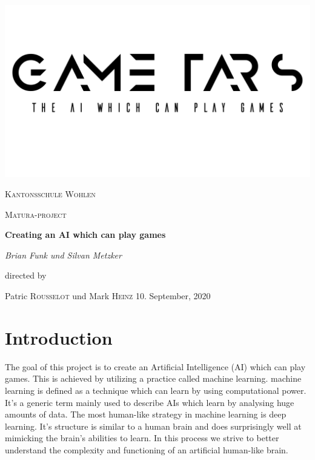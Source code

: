 \documentclass[12pt]{article}
\begin{document}

\begin{titlepage}
    \centering
    \includegraphics[width=1\textwidth]{pictures/title.pdf}\par\vspace{0.5cm}
    {\scshape\LARGE Kantonsschule Wohlen \par}
    \vspace{0.2cm}
    {\scshape\Large Matura-project\par}
    \vspace{2cm}
    {\huge\bfseries Creating an AI which can play games\par}
    \vspace{2cm}
    {\Large\itshape Brian Funk und Silvan Metzker\par}
    \vfill
    directed by\par
    Patric \textsc{Rousselot} und Mark \textsc{Heinz}
    \vfill 
    {10. September, 2020}
\end{titlepage}
\tableofcontents
\newpage

\section{Introduction}
The goal of this project is to create an \gls{Artificial Intelligence} (\gls{AI}) which can play games. This is achieved by utilizing a practice called \gls{machine learning}. \Gls{machine learning} is defined as a technique which can learn by using computational power. It's a generic term mainly used to describe \gls{AI}s which learn by analysing huge amounts of data. 
The most human-like strategy in \gls{machine learning} is \gls{deep learning}. It's structure is similar to a human brain and does surprisingly well at mimicking the brain's abilities to learn. In this process we strive to better understand the complexity and functioning of an artificial human-like brain. 
\end{document}
